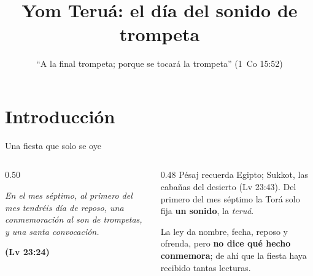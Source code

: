 \documentclass[hyperref={bookmarks=false},aspectratio=169]{beamer}
\title[Yom Teruá]{\bfseries{Yom Teruá: el día del sonido de trompeta}}
\subtitle{``A la final trompeta; porque se tocará la trompeta'' (1~Co 15:52)}
\author{}\institute{}\date{}
\newcommand{\destacar}[1]{\textbf{\textcolor{tierraroja}{#1}}}
\begin{document}
\frame{\titlepage}


\section{Introducción}

\begin{frame}{Una fiesta que solo se oye}
\begin{columns}[c,onlytextwidth]
\begin{column}{0.50\textwidth}
\begin{tcolorbox}[colback=papiro,colframe=mostaza,boxrule=1.2pt,arc=3pt]
\centering\itshape En el mes séptimo, al primero del mes tendréis día de reposo, una conmemoración al son de trompetas, y una santa convocación.\par\upshape\footnotesize\textcolor{tierraroja}{\textbf{(Lv 23:24)}}
\end{tcolorbox}
\end{column}
\begin{column}{0.48\textwidth}\small\RaggedRight
Pésaj recuerda Egipto; Sukkot, las cabañas del desierto (Lv 23:43). Del primero del mes séptimo la Torá solo fija \destacar{un sonido}, la \emph{teruá}.\par\medskip
La ley da nombre, fecha, reposo y ofrenda, pero \destacar{no dice qué hecho conmemora}; de ahí que la fiesta haya recibido tantas lecturas.
\end{column}
\end{columns}
\end{frame}
\end{document}
